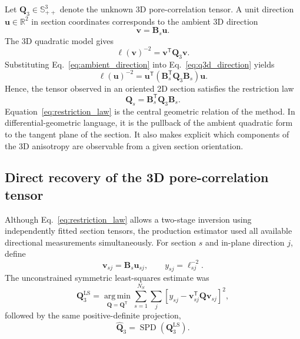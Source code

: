 \documentclass{article}
\begin{document}
Let $\bm{Q}_{3}\in\mathbb{S}_{++}^{3}$ denote the unknown 3D
pore-correlation tensor. A unit direction $\bm{u}\in\mathbb{R}^{2}$ in
section coordinates corresponds to the ambient 3D direction
\begin{equation}
    \bm{v}
    =
    \bm{B}_{s}\bm{u}.
    \label{eq:ambient_direction}
\end{equation}
The 3D quadratic model gives
\begin{equation}
    \ell(\bm{v})^{-2}
    =
    \bm{v}^{\mathsf T}
    \bm{Q}_{3}
    \bm{v}.
    \label{eq:q3d_direction}
\end{equation}
Substituting Eq.~\eqref{eq:ambient_direction} into
Eq.~\eqref{eq:q3d_direction} yields
\begin{equation}
    \ell(\bm{u})^{-2}
    =
    \bm{u}^{\mathsf T}
    \left(
        \bm{B}_{s}^{\mathsf T}
        \bm{Q}_{3}
        \bm{B}_{s}
    \right)
    \bm{u}.
    \label{eq:restriction_derivation}
\end{equation}
Hence, the tensor observed in an oriented 2D section satisfies the restriction
law
\begin{equation}
    \boxed{
    \bm{Q}_{s}
    =
    \bm{B}_{s}^{\mathsf T}
    \bm{Q}_{3}
    \bm{B}_{s}.
    }
    \label{eq:restriction_law}
\end{equation}
Equation~\eqref{eq:restriction_law} is the central geometric relation of the
method. In differential-geometric language, it is the pullback of the
ambient quadratic form to the tangent plane of the section. It also makes
explicit which components of the 3D anisotropy are observable from a given
section orientation.

\subsection{Direct recovery of the 3D pore-correlation tensor}
\label{subsec:q3d_recovery}

Although Eq.~\eqref{eq:restriction_law} allows a two-stage inversion using
independently fitted section tensors, the production estimator used all
available directional measurements simultaneously. For section $s$ and
in-plane direction $j$, define
\begin{equation}
    \bm{v}_{sj}
    =
    \bm{B}_{s}\bm{u}_{sj},
    \qquad
    y_{sj}
    =
    \ell_{sj}^{-2}.
    \label{eq:global_observations}
\end{equation}
The unconstrained symmetric least-squares estimate was
\begin{equation}
    \bm{Q}_{3}^{\mathrm{LS}}
    =
    \underset{\bm{Q}=\bm{Q}^{\mathsf T}}{\operatorname{arg\,min}}
    \sum_{s=1}^{N_{S}}
    \sum_{j}
    \left[
        y_{sj}
        -
        \bm{v}_{sj}^{\mathsf T}
        \bm{Q}
        \bm{v}_{sj}
    \right]^{2},
    \label{eq:q3d_fit}
\end{equation}
followed by the same positive-definite projection,
\begin{equation}
    \widehat{\bm{Q}}_{3}
    =
    \operatorname{SPD}
    \left(
        \bm{Q}_{3}^{\mathrm{LS}}
    \right).
\end{equation}
\end{document}
